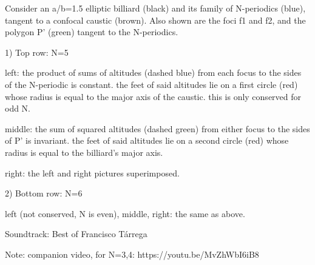 Consider an a/b=1.5 elliptic billiard (black) and its family of N-periodics (blue), tangent to a confocal caustic (brown). Also shown are the foci f1 and f2, and the polygon P' (green) tangent to the N-periodics.

1) Top row: N=5

left: the product of sums of altitudes (dashed blue) from each focus to the sides of the N-periodic is constant. the feet of said altitudes lie on a first circle (red) whose radius is equal to the major axis of the caustic. this is only conserved for odd N.

middle: the sum of squared altitudes (dashed green) from either focus to the sides of P' is invariant. the feet of said altitudes lie on a second circle (red) whose radius is equal to the billiard's major axis.

right: the left and right pictures superimposed.

2) Bottom row: N=6

left (not conserved, N is even), middle, right: the same as above.

Soundtrack: Best of Francisco Tárrega

Note: companion video, for N=3,4: https://youtu.be/MvZhWbI6iB8